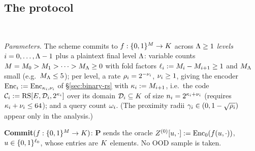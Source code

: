 \subsection{The protocol}\label{sec:protocol}

\begin{protocol}\label{fig:protocol}
\ \par\smallskip
\emph{Parameters.} The scheme commits to $f : \{0,1\}^{M} \to K$ across $\Lambda \ge 1$ \emph{levels} $i = 0, \dots, \Lambda-1$ plus a plaintext final level $\Lambda$: variable counts $M = M_0 > M_1 > \dots > M_\Lambda \ge 0$ with fold factors $\ell_i := M_i - M_{i+1} \ge 1$ and $M_\Lambda$ small (e.g.\ $M_\Lambda \le 5$); per level, a rate $\rho_i = 2^{-\nu_i}$, $\nu_i \ge 1$, giving the encoder $\mathrm{Enc}_i := \mathrm{Enc}_{\kappa_i, \nu_i}$ of \S\ref{sec:binary-rs} with $\kappa_i := M_{i+1}$, i.e.\ the code $\mathcal{C}_i := \mathrm{RS}[E, \mathcal{D}_i, 2^{\kappa_i}]$ over its domain $\mathcal{D}_i \subseteq K$ of size $n_i = 2^{\kappa_i + \nu_i}$ (requires $\kappa_i + \nu_i \le 64$); and a query count $\omega_i$. (The proximity radii $\gamma_i \in (0, 1 - \sqrt{\rho_i})$ appear only in the analysis.)

\smallskip
\textbf{Commit}$(f : \{0,1\}^{M} \to K)$: $\mathbf{P}$ sends the oracle $Z^{(0)}[u, \cdot] := \mathrm{Enc}_0(f(u, \cdot))$, $u \in \{0,1\}^{\ell_0}$, whose entries are $K$ elements. No OOD sample is taken.


\end{protocol}
